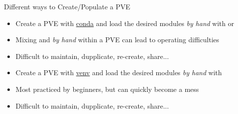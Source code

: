 \documentclass[10pt,serif,mathserif,compress,hyperref={colorlinks}]{beamer}
\begin{document}
\begin{frame}{Different ways to Create/Populate a PVE}
  
  \begin{tcolorbox}[title=The naive way: install the modules {\em by hand} in a {\bf conda} PVE]
    \begin{itemize}
    \item Create a PVE with \href{https://docs.conda.io/projects/conda/en/stable/}{conda} and load the desired modules {\em by hand} with 
       or 
    \item[\unhappy] Mixing  and  {\em by hand} within a  PVE can lead to operating difficulties
    \item[\unhappy] Difficult to maintain, dupplicate, re-create, share...
    \end{itemize}
  \end{tcolorbox}
\vspace*{-2.5mm}
  \begin{tcolorbox}[title=The naive way: install the modules {\em by hand} in a {\bf venv}  PVE]
    \begin{itemize}
    \item Create a PVE with \href{https://docs.python.org/3/library/venv.html}{venv} and load the desired modules {\em by hand} with 
    \item[\unhappy] Most practiced by beginners, but can quickly become a mess
    \item[\unhappy] Difficult to maintain, dupplicate, re-create, share...
    \end{itemize}
  \end{tcolorbox}
\end{frame}
\end{document}
